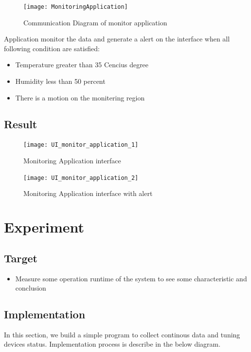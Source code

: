 \documentclass[runningheads,a4paper]{llncs}
\begin{document}
\begin{figure}[H]
\centering
\texttt{[image: MonitoringApplication]} 
\caption{Communication Diagram of monitor application}
\end{figure} 


Application monitor the data and generate a alert on the interface when all following condition are satisfied:

\begin{itemize}
\item Temperature greater than 35 Cencius degree
\item Humidity less than 50 percent
\item There is a motion on the monitering region
\end{itemize}


\subsection{Result}

\begin{figure}[H]
\centering
\texttt{[image: UI\_monitor\_application\_1]} 
\caption{Monitoring Application interface}
\end{figure} 


\begin{figure}[H]
\centering
\texttt{[image: UI\_monitor\_application\_2]} 
\caption{Monitoring Application interface with alert}
\end{figure} 


\section{Experiment}

\subsection{Target}
\begin{itemize}
\item Measure some operation runtime of the system to see some characteristic and conclusion  
\end{itemize}

\subsection{Implementation}

In this section, we build a simple program to collect continous data and tuning devices status. Implementation process is describe in the below diagram.
\end{document}
